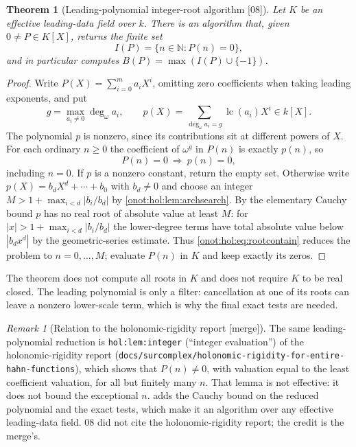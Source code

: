 \documentclass[11pt,oneside]{article}
\numberwithin{equation}{section}
\newtheorem{theorem}{Theorem}[section]
\theoremstyle{definition}
\theoremstyle{remark}
\newtheorem{remark}[remark]{Remark}
\newcommand{\N}{\mathbb N}
\newcommand{\lc}{\operatorname{lc}}
\newcommand{\ddeg}{\operatorname{deg}_{\omega}}
\newcommand{\src}[1]{\textup{\textsf{\small[#1]}}}
\newcommand{\mergetag}{\textup{\textsf{\small[merge]}}}
\newcommand{\replabel}[1]{\nolinkurl{#1}}
\newcommand{\fn}[1]{\nolinkurl{#1}}
\begin{document}
\begin{theorem}[Leading-polynomial integer-root algorithm \src{08}]\label{onot:hol:thm:integerroots}
Let $K$ be an effective leading-data field over $k$. There is an algorithm that,
given $0\ne P\in K[X]$, returns the finite set
\[
 I(P)=\{n\in\N:P(n)=0\},
\]
and in particular computes $B(P)=\max(I(P)\cup\{-1\})$.
\end{theorem}
\begin{proof}
Write $P(X)=\sum_{i=0}^ma_iX^i$, omitting zero coefficients when taking leading
exponents, and put
\[
 g=\max_{a_i\ne0}\ddeg a_i,\qquad p(X)=\sum_{\ddeg a_i=g}\lc(a_i)X^i\in k[X].
\]
The polynomial $p$ is nonzero, since its contributions sit at different powers
of $X$. For each ordinary $n\ge0$ the coefficient of $\omega^g$ in $P(n)$ is
exactly $p(n)$, so
\begin{equation}\label{onot:hol:eq:rootcontain}
 P(n)=0\ \Longrightarrow\ p(n)=0,
\end{equation}
including $n=0$. If $p$ is a nonzero constant, return the empty set. Otherwise
write $p(X)=b_dX^d+\cdots+b_0$ with $b_d\ne0$ and choose an integer
$M>1+\max_{i<d}|b_i/b_d|$ by \cref{onot:hol:lem:archsearch}. By the elementary
Cauchy bound $p$ has no real root of absolute value at least $M$: for
$|x|>1+\max_{i<d}|b_i/b_d|$ the lower-degree terms have total absolute value
below $|b_dx^d|$ by the geometric-series estimate. Thus
\eqref{onot:hol:eq:rootcontain} reduces the problem to $n=0,\ldots,M$; evaluate
$P(n)$ in $K$ and keep exactly its zeros.
\end{proof}

The theorem does not compute all roots in $K$ and does not require $K$ to be
real closed. The leading polynomial is only a filter: cancellation at one of its
roots can leave a nonzero lower-scale term, which is why the final exact tests
are needed.

\begin{remark}[Relation to the holonomic-rigidity report \mergetag]\label{onot:hol:rem:holinteger}
The same leading-polynomial reduction is \replabel{hol:lem:integer} (``integer
evaluation'') of the holonomic-rigidity report
(\fn{docs/surcomplex/holonomic-rigidity-for-entire-hahn-functions}), which
shows that $P(n)\ne0$, with valuation equal to the least coefficient valuation,
for all but finitely many $n$. That lemma is not effective: it does not bound the
exceptional $n$.  adds the Cauchy bound on the
reduced polynomial and the exact tests, which make it an algorithm over any
effective leading-data field. 08 did not cite the holonomic-rigidity report; the
credit is the merge's.
\end{remark}
\end{document}
